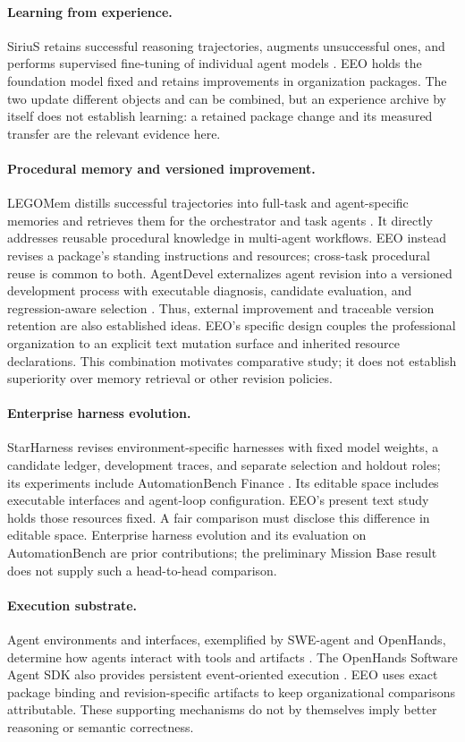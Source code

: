 \paragraph{Learning from experience.}
SiriuS retains successful reasoning trajectories, augments unsuccessful ones, and performs supervised fine-tuning of individual agent models \citep{sirius}. EEO holds the foundation model fixed and retains improvements in organization packages. The two update different objects and can be combined, but an experience archive by itself does not establish learning: a retained package change and its measured transfer are the relevant evidence here.

\paragraph{Procedural memory and versioned improvement.}
LEGOMem distills successful trajectories into full-task and agent-specific memories and retrieves them for the orchestrator and task agents \citep{legomem}. It directly addresses reusable procedural knowledge in multi-agent workflows. EEO instead revises a package's standing instructions and resources; cross-task procedural reuse is common to both. AgentDevel externalizes agent revision into a versioned development process with executable diagnosis, candidate evaluation, and regression-aware selection \citep{agentdevel}. Thus, external improvement and traceable version retention are also established ideas. EEO's specific design couples the professional organization to an explicit text mutation surface and inherited resource declarations. This combination motivates comparative study; it does not establish superiority over memory retrieval or other revision policies.

\paragraph{Enterprise harness evolution.}
StarHarness revises environment-specific harnesses with fixed model weights, a candidate ledger, development traces, and separate selection and holdout roles; its experiments include AutomationBench Finance \citep{starharness}. Its editable space includes executable interfaces and agent-loop configuration. EEO's present text study holds those resources fixed. A fair comparison must disclose this difference in editable space. Enterprise harness evolution and its evaluation on AutomationBench are prior contributions; the preliminary Mission Base result does not supply such a head-to-head comparison.

\paragraph{Execution substrate.}
Agent environments and interfaces, exemplified by SWE-agent and OpenHands, determine how agents interact with tools and artifacts \citep{sweagent,openhands}. The OpenHands Software Agent SDK also provides persistent event-oriented execution \citep{ohsdk}. EEO uses exact package binding and revision-specific artifacts to keep organizational comparisons attributable. These supporting mechanisms do not by themselves imply better reasoning or semantic correctness.
